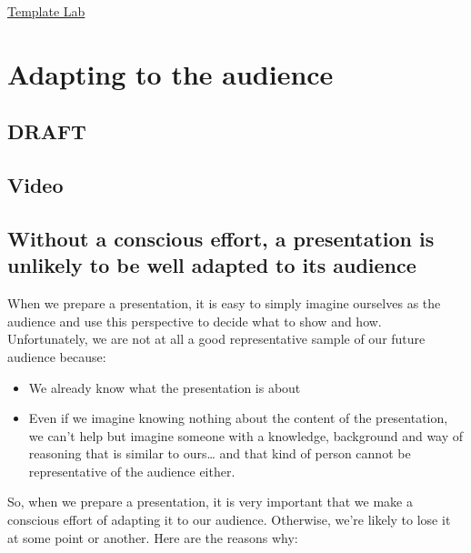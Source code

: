 \documentclass[
]{book}
\providecommand{\tightlist}{%
  \setlength{\itemsep}{0pt}\setlength{\parskip}{0pt}}
\begin{document}
\href{https://templatelab.com/research-posters/}{Template Lab}

\hypertarget{audience1}{%
\chapter{Adapting to the audience}\label{audience1}}

\hypertarget{draft-2}{%
\section{DRAFT}\label{draft-2}}

\hypertarget{video-3}{%
\section{Video}\label{video-3}}

\hypertarget{without-a-conscious-effort-a-presentation-is-unlikely-to-be-well-adapted-to-its-audience}{%
\section{Without a conscious effort, a presentation is unlikely to be well adapted to its audience}\label{without-a-conscious-effort-a-presentation-is-unlikely-to-be-well-adapted-to-its-audience}}

When we prepare a presentation, it is easy to simply imagine ourselves as the audience and use this perspective to decide what to show and how. Unfortunately, we are not at all a good representative sample of our future audience because:

\begin{itemize}
\tightlist
\item
  We already know what the presentation is about
\item
  Even if we imagine knowing nothing about the content of the presentation, we can't help but imagine someone with a knowledge, background and way of reasoning that is similar to ours\ldots{} and that kind of person cannot be representative of the audience either.
\end{itemize}

So, when we prepare a presentation, it is very important that we make a conscious effort of adapting it to our audience. Otherwise, we're likely to lose it at some point or another. Here are the reasons why:
\end{document}
